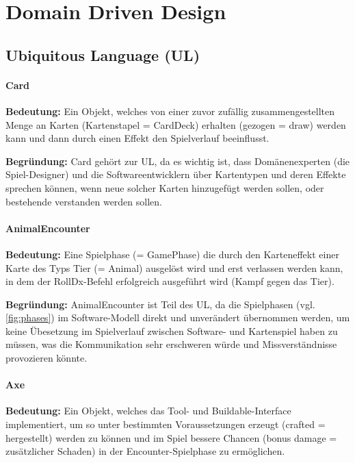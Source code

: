 \chapter{Domain Driven Design} \label{sec:ddd}

\section{Ubiquitous Language (UL)}

\subsubsection{Card}

\textbf{Bedeutung:} Ein Objekt, welches von einer zuvor zufällig zusammengestellten Menge an Karten (Kartenstapel = CardDeck) 
erhalten (gezogen = draw) werden kann und dann durch einen Effekt den Spielverlauf beeinflusst.

\textbf{Begründung:} Card gehört zur UL, da es wichtig ist, dass Domänenexperten (die Spiel-Designer) und die Softwareentwicklern 
über Kartentypen und deren Effekte sprechen können, wenn neue solcher Karten hinzugefügt werden sollen, oder bestehende verstanden 
werden sollen. 


\subsubsection{AnimalEncounter}

\textbf{Bedeutung:} Eine Spielphase (= GamePhase) die durch den Karteneffekt einer Karte des Typs Tier (= Animal) 
ausgelöst wird und erst verlassen werden kann, in dem der RollDx-Befehl erfolgreich ausgeführt wird (Kampf gegen das Tier).

\textbf{Begründung:} AnimalEncounter ist Teil des UL, da die Spielphasen (vgl. \autoref{fig:phases}) im Software-Modell direkt und unverändert 
übernommen werden, um keine Übesetzung im Spielverlauf zwischen Software- und Kartenspiel haben zu müssen, was die Kommunikation sehr 
erschweren würde und Missverständnisse provozieren könnte. 


\subsubsection{Axe}

\textbf{Bedeutung:} Ein Objekt, welches das Tool- und Buildable-Interface implementiert, um so unter bestimmten Voraussetzungen 
erzeugt (crafted = hergestellt) werden zu können und im Spiel bessere Chancen (bonus damage = 
zusätzlicher Schaden) in der Encounter-Spielphase zu ermöglichen.

